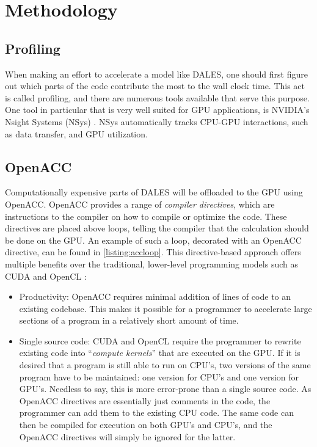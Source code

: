 \section{Methodology}

\subsection{Profiling}
When making an effort to accelerate a model like DALES, one should first figure out which parts of the code contribute the most to the wall clock time. This act is called profiling, and there are numerous tools available that serve this purpose. One tool in particular that is very well suited for GPU applications, is NVIDIA's Nsight Systems (NSys) \citep{nvidiaNVIDIANsightSystems}. NSys automatically tracks CPU-GPU interactions, such as data transfer, and GPU utilization. 

\subsection{OpenACC}
Computationally expensive parts of DALES will be offloaded to the GPU using OpenACC. OpenACC provides a range of \emph{compiler directives}, which are instructions to the compiler on how to compile or optimize the code. These directives are placed above loops, telling the compiler that the calculation should be done on the GPU. An example of such a loop, decorated with an OpenACC directive, can be found in \autoref{listing:accloop}. This directive-based approach offers multiple benefits over the traditional, lower-level programming models such as CUDA and OpenCL \citep{herdmanAcceleratingHydrocodesOpenACC2012}:

\begin{itemize}
    \item Productivity: OpenACC requires minimal addition of lines of code to an existing codebase. This makes it possible for a programmer to accelerate large sections of a program in a relatively short amount of time. 
    \item Single source code: CUDA and OpenCL require the programmer to rewrite existing code into ``\emph{compute kernels}'' that are executed on the GPU. If it is desired that a program is still able to run on CPU's, two versions of the same program have to be maintained: one version for CPU's and one version for GPU's. Needless to say, this is more error-prone than a single source code. As OpenACC directives are essentially just comments in the code, the programmer can add them to the existing CPU code. The same code can then be compiled for execution on both GPU's and CPU's, and the OpenACC directives will simply be ignored for the latter.
\end{itemize}

